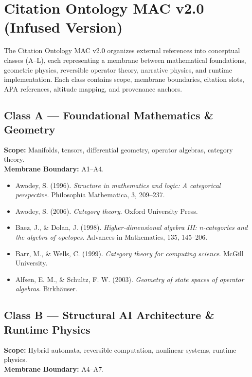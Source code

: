 
\section*{Citation Ontology MAC v2.0 (Infused Version)}
\label{sec:ontology}

The Citation Ontology MAC v2.0 organizes external references into conceptual
classes (A–L), each representing a membrane between mathematical foundations,
geometric physics, reversible operator theory, narrative physics, and runtime
implementation. Each class contains scope, membrane boundaries, citation slots,
APA references, altitude mapping, and provenance anchors.

\subsection*{Class A — Foundational Mathematics \& Geometry}
\textbf{Scope:} Manifolds, tensors, differential geometry, operator algebras,
category theory. \\
\textbf{Membrane Boundary:} A1–A4.

\begin{itemize}
  \item Awodey, S. (1996). \textit{Structure in mathematics and logic: A categorical perspective}. Philosophia Mathematica, 3, 209–237.
  \item Awodey, S. (2006). \textit{Category theory}. Oxford University Press.
  \item Baez, J., \& Dolan, J. (1998). \textit{Higher-dimensional algebra III: n-categories and the algebra of opetopes}. Advances in Mathematics, 135, 145–206.
  \item Barr, M., \& Wells, C. (1999). \textit{Category theory for computing science}. McGill University.
  \item Alfsen, E. M., \& Schultz, F. W. (2003). \textit{Geometry of state spaces of operator algebras}. Birkhäuser.
\end{itemize}

\subsection*{Class B — Structural AI Architecture \& Runtime Physics}
\textbf{Scope:} Hybrid automata, reversible computation, nonlinear systems,
runtime physics. \\
\textbf{Membrane Boundary:} A4–A7.

